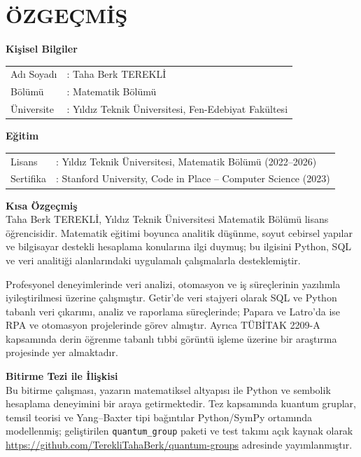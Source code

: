 \clearpage
\chapter*{ÖZGEÇMİŞ}

\noindent
\textbf{Kişisel Bilgiler}\\[4pt]
\begin{tabularx}{\textwidth}{@{}p{4cm}X@{}}
Adı Soyadı      & : Taha Berk TEREKLİ \\
Bölümü          & : Matematik Bölümü \\
Üniversite      & : Yıldız Teknik Üniversitesi, Fen-Edebiyat Fakültesi \\
\end{tabularx}

\vspace{0.6cm}
\noindent
\textbf{Eğitim}\\[4pt]
\begin{tabularx}{\textwidth}{@{}p{4cm}X@{}}
Lisans & : Yıldız Teknik Üniversitesi, Matematik Bölümü (2022--2026) \\
Sertifika & : Stanford University, Code in Place -- Computer Science (2023) \\
\end{tabularx}

\vspace{0.6cm}
\noindent
\textbf{Kısa Özgeçmiş}\\[4pt]
Taha Berk TEREKLİ, Yıldız Teknik Üniversitesi Matematik Bölümü lisans
öğrencisidir. Matematik eğitimi boyunca analitik düşünme, soyut cebirsel yapılar
ve bilgisayar destekli hesaplama konularına ilgi duymuş; bu ilgisini Python,
SQL ve veri analitiği alanlarındaki uygulamalı çalışmalarla desteklemiştir.

Profesyonel deneyimlerinde veri analizi, otomasyon ve iş süreçlerinin yazılımla
iyileştirilmesi üzerine çalışmıştır. Getir'de veri stajyeri olarak SQL ve Python
tabanlı veri çıkarımı, analiz ve raporlama süreçlerinde; Papara ve Latro'da ise
RPA ve otomasyon projelerinde görev almıştır. Ayrıca TÜBİTAK 2209-A kapsamında
derin öğrenme tabanlı tıbbi görüntü işleme üzerine bir araştırma projesinde yer
almaktadır.

\vspace{0.6cm}
\noindent
\textbf{Bitirme Tezi ile İlişkisi}\\[4pt]
Bu bitirme çalışması, yazarın matematiksel altyapısı ile Python ve sembolik
hesaplama deneyimini bir araya getirmektedir. Tez kapsamında kuantum gruplar,
temsil teorisi ve Yang--Baxter tipi bağıntılar Python/SymPy ortamında
modellenmiş; geliştirilen \texttt{quantum\_group} paketi ve test takımı açık
kaynak olarak \url{https://github.com/TerekliTahaBerk/quantum-groups}
adresinde yayımlanmıştır.


